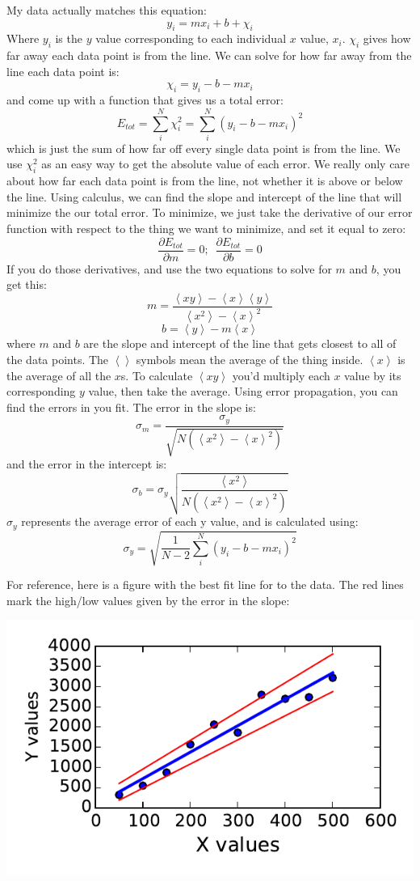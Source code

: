 \documentclass{book}
\begin{document}
My data actually matches this equation:
\[y_i=mx_i+b+\chi_i\]
Where $y_i$ is the $y$ value corresponding to each individual $x$ value, $x_i$.  $\chi_i$ gives how far away each data point is from the line. We can solve for how far away from the line each data point is:
\[\chi_i=y_i-b-mx_i\]
and come up with a function that gives us a total error:
\[E_{tot}=\sum_i^N \chi_i^2 = \sum_i^N (y_i-b-mx_i)^2\]
which is just the sum of how far off every single data point is from the line.  We use $\chi_i^2$ as an easy way to get the absolute value of each error.  We really only care about how far each data point is from the line, not whether it is above or below the line.  Using calculus, we can find the slope and intercept of the line that will minimize the our total error.  To minimize, we just take the derivative of our error function with respect to the thing we want to minimize, and set it equal to zero:
\[\frac{\partial E_{tot}}{\partial m}=0;\,\,\,\frac{\partial E_{tot}}{\partial b}=0\]
If you do those derivatives, and use the two equations to solve for $m$ and $b$, you get this:
\[m=\frac{\left<xy\right>-\left<x\right>\left<y\right>}{\left<x^2\right>-\left<x\right>^2}\]
\[b=\left<y\right>-m\left<x\right>\]
where $m$ and $b$ are the slope and intercept of the line that gets closest to all of the data points.  The $\left<\right>$ symbols mean the average of the thing inside. $\left<x\right>$ is the average of all the $x$s.  To calculate $\left<xy\right>$ you'd multiply each $x$ value by its corresponding $y$ value, then take the average.
Using error propagation, you can find the errors in you fit.  The error in the slope is:
\[\sigma_m=\frac{\sigma_y}{\sqrt{N\left(\left<x^2\right>-\left<x\right>^2\right)}}\]
and the error in the intercept is:
\[\sigma_b=\sigma_y\sqrt{\frac{\left<x^2\right>}{N\left(\left<x^2\right>-\left<x\right>^2\right)}}\]
$\sigma_y$ represents the average error of each y value, and is calculated using:
\[\sigma_y=\sqrt{\frac{1}{N-2}\sum_i^N \left(y_i-b-mx_i\right)^2}\]

For reference, here is a figure with the best fit line for to the data.  The red lines mark the high/low values given by the error in the slope:
\begin{center}
\includegraphics{Lab4_figs/dataWfitRange.pdf}
\end{center}
\end{document}
